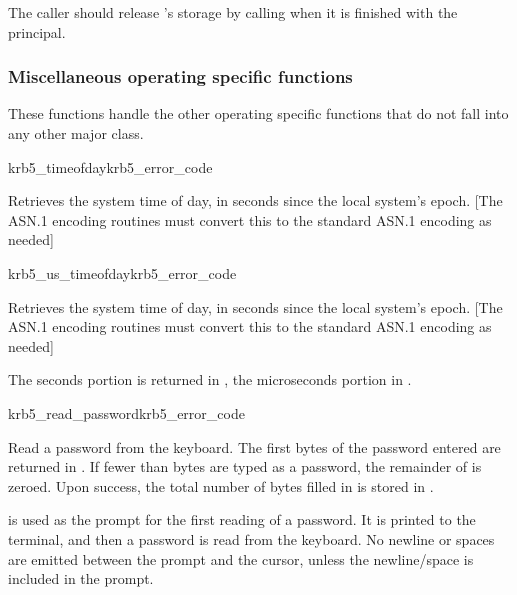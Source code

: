 The caller should release 's storage by calling
 when it is finished with the principal.



\subsubsection{Miscellaneous operating specific functions}
These functions handle the other operating specific functions that do
not fall into any other major class.

\begin{funcdecl}{krb5_timeofday}{krb5_error_code}{\funcin}
\funcout
{}
\end{funcdecl}

Retrieves the system time of day, in seconds since the local system's
epoch.
[The ASN.1 encoding routines must convert this to the standard ASN.1
encoding as needed]

\begin{funcdecl}{krb5_us_timeofday}{krb5_error_code}{\funcin}
\funcout
{}
\end{funcdecl}

Retrieves the system time of day, in seconds since the local system's
epoch.
[The ASN.1 encoding routines must convert this to the standard ASN.1
encoding as needed]

{\raggedright The seconds portion is returned in , the
microseconds portion in .}

\begin{funcdecl}{krb5_read_password}{krb5_error_code}{\funcin}
\funcout
{}
\funcinout
{}
\end{funcdecl}

Read a password from the keyboard.  The first 
bytes of the password entered are returned in .
If fewer than  bytes are typed as a password,
the remainder of  is zeroed.  Upon success, the
total number of bytes filled in is stored in .

 is used as the prompt for the first reading of a password.
It is printed to the terminal, and then a password is read from the
keyboard.  No newline or spaces are emitted between the prompt and the
cursor, unless the newline/space is included in the prompt.

